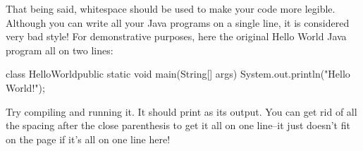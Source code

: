 That being said, whitespace should be used to make your code more legible. Although you can write
all your Java programs on a single line, it is considered very bad style!
For demonstrative purposes, here the original Hello World Java program all on two lines:
\begin{code}
class HelloWorld{public static void main(String[] args)
    {System.out.println("Hello World!");}}
\end{code}
Try compiling and running it. It should print  as its output.
You can get rid of all the spacing after the close parenthesis \ic{)} to get it all on one line--it
just doesn't fit on the page if it's all on one line here!
